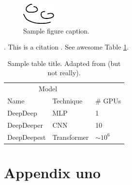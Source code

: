 \documentclass[twocolumn]{article}
\begin{document}
\begin{figure}[t!]
	\centering
	\includegraphics[width=0.30\linewidth]{happy}
	\caption{Sample figure caption.}
	\label{fig:fig1}
\end{figure}

\lipsum[6]. This is a citation \citep{kingma2014adam, vaswani2017attention}. See awesome Table \ref{tab:table}.

\begin{table}[t!]
	\caption{Sample table title. Adapted from \citet{devlin2018bert} (but not really).}
	\centering
	\begin{tabular}{lll}
		\toprule
		\multicolumn{2}{c}{Model}                   \\
		\cmidrule(r){1-2}
		Name     & Technique     & \# GPUs \\
		\midrule
		DeepDeep & MLP  & 1     \\
		DeepDeeper     & CNN & 10      \\
		DeepDeepest     & Transformer       & $\sim10^6$  \\
		\bottomrule
	\end{tabular}
	\label{tab:table}
\end{table}




\appendix

\section{Appendix uno} \label{appendix}
\lipsum[8]
\end{document}
